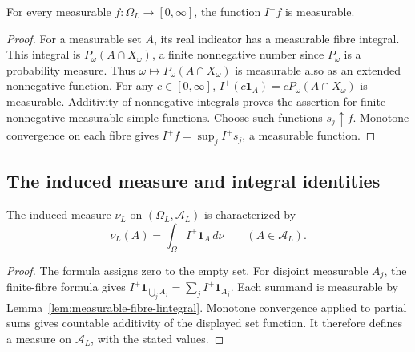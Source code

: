 \begin{lemma}\label{lem:measurable-fibre-lintegral}
\leanok
{}
For every measurable $f:\Omega_L\to[0,\infty]$, the function $I^+f$
is measurable.
\end{lemma}
\begin{proof}
For a measurable set $A$, its real indicator has a measurable fibre
integral. This integral is $P_\omega(A\cap X_\omega)$, a finite
nonnegative number since $P_\omega$ is a probability measure.
Thus $\omega\mapsto P_\omega(A\cap X_\omega)$ is measurable also
as an extended nonnegative function. For any $c\in[0,\infty]$,
$I^+(c\mathbf1_A)=cP_\omega(A\cap X_\omega)$ is measurable.
Additivity of nonnegative integrals proves the assertion for finite
nonnegative measurable simple functions. Choose such functions
$s_j\uparrow f$. Monotone convergence on each fibre gives
$I^+f=\sup_j I^+s_j$, a measurable function.
\end{proof}

\subsection{The induced measure and integral identities}

\begin{definition}\label{def:separable-induced-measure}
\leanok
{}
The induced measure $\nu_L$ on $(\Omega_L,\mathcal A_L)$ is characterized by
\[
 \nu_L(A)=\int_\Omega I^+\mathbf1_A\,d\nu
 \qquad(A\in\mathcal A_L).
\]
\end{definition}
\begin{proof}
The formula assigns zero to the empty set. For disjoint measurable
$A_j$, the finite-fibre formula gives
$I^+\mathbf1_{\bigcup_j A_j}=\sum_j I^+\mathbf1_{A_j}$.
Each summand is measurable by Lemma~\ref{lem:measurable-fibre-lintegral}.
Monotone convergence applied to partial sums gives countable additivity
of the displayed set function. It therefore defines a measure on
$\mathcal A_L$, with the stated values.
\end{proof}

